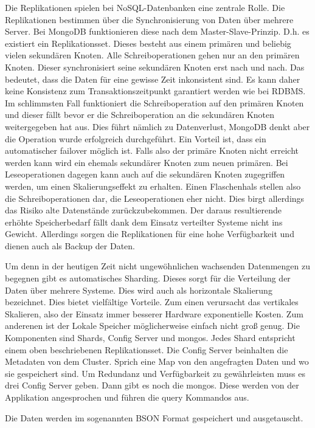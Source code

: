 Die Replikationen spielen bei NoSQL-Datenbanken eine zentrale Rolle. Die
Replikationen bestimmen über die Synchronisierung von Daten über mehrere
Server. Bei MongoDB funktionieren diese nach dem Master-Slave-Prinzip.
D.h. es existiert ein Replikationsset. Dieses besteht aus einem primären
und beliebig vielen sekundären Knoten. Alle Schreiboperationen gehen nur
an den primären Knoten. Dieser synchronisiert seine sekundären Knoten
erst nach und nach. Das bedeutet, dass die Daten für eine gewisse Zeit
inkonsistent sind. Es kann daher keine Konsistenz zum
Transaktionszeitpunkt garantiert werden wie bei RDBMS. Im schlimmsten
Fall funktioniert die Schreiboperation auf den primären Knoten und
dieser fällt bevor er die Schreiboperation an die sekundären Knoten
weitergegeben hat aus. Dies führt nämlich zu Datenverlust, MongoDB denkt
aber die Operation wurde erfolgreich durchgeführt. Ein Vorteil ist, dass
ein automatischer failover möglich ist. Falls also der primäre Knoten
nicht erreicht werden kann wird ein ehemals sekundärer Knoten zum neuen
primären. Bei Leseoperationen dagegen kann auch auf die sekundären
Knoten zugegriffen werden, um einen Skalierungseffekt zu erhalten. Einen
Flaschenhals stellen also die Schreiboperationen dar, die
Leseoperationen eher nicht. Dies birgt allerdings das Risiko alte
Datenstände zurückzubekommen. Der daraus resultierende erhöhte
Speicherbedarf fällt dank dem Einsatz verteilter Systeme nicht ins
Gewicht. Allerdings sorgen die Replikationen für eine hohe Verfügbarkeit
und dienen auch als Backup der Daten.

Um denn in der heutigen Zeit nicht ungewöhnlichen wachsenden Datenmengen
zu begegnen gibt es automatisches Sharding. Dieses sorgt für die
Verteilung der Daten über mehrere Systeme. Dies wird auch als
horizontale Skalierung bezeichnet. Dies bietet vielfältige Vorteile. Zum
einen verursacht das vertikales Skalieren, also der Einsatz immer
besserer Hardware exponentielle Kosten. Zum anderenen ist der Lokale
Speicher möglicherweise einfach nicht groß genug. Die Komponenten sind
Shards, Config Server und mongos. Jedes Shard entspricht einem oben
beschriebenen Replikationsset. Die Config Server beinhalten die
Metadaten von dem Cluster. Sprich eine Map von den angefragten Daten und
wo sie gespeichert sind. Um Redundanz und Verfügbarkeit zu gewährleisten
muss es drei Config Server geben. Dann gibt es noch die mongos. Diese
werden von der Applikation angesprochen und führen die query Kommandos
aus.

Die Daten werden im sogenannten BSON Format gespeichert und
ausgetauscht.

